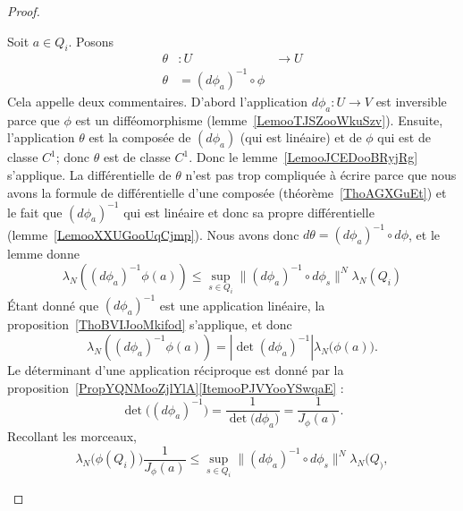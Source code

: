 \begin{proof}
\begin{enumerate}
\begin{subproof}
                Soit \( a\in Q_i\). Posons
                \begin{equation}
                    \begin{aligned}
                        \theta&\colon U&\to U \\
                        \theta&=(d\phi_{a})^{-1}\circ\phi
                    \end{aligned}
                \end{equation}
                Cela appelle deux commentaires. D'abord l'application \( d\phi_{a}\colon U\to V\) est inversible parce que \( \phi\) est un difféomorphisme (lemme~\ref{LemooTJSZooWkuSzv}). Ensuite, l'application \( \theta\) est la composée de \( (d\phi_{a})\) (qui est linéaire) et de \( \phi\) qui est de classe \( C^1\); donc \( \theta\) est de classe \( C^1\). Donc le lemme~\ref{LemooJCEDooBRyjRg} s'applique. La différentielle de \( \theta\) n'est pas trop compliquée à écrire parce que nous avons la formule de différentielle d'une composée (théorème~\ref{ThoAGXGuEt}) et le fait que \( (d\phi_{a})^{-1}\) qui est linéaire et donc sa propre différentielle (lemme~\ref{LemooXXUGooUqCjmp}). Nous avons donc \( d\theta=(d\phi_a)^{-1}\circ d\phi\), et le lemme donne
                \begin{equation}
                    \lambda_N\left( (d\phi_a)^{-1}\phi(a) \right)\leq \sup_{s\in Q_i}\|    (d\phi_a)^{-1}\circ d\phi_s  \|^N\lambda_N(Q_i)
                \end{equation}
                Étant donné que \( (d\phi_a)^{-1}\) est une application linéaire, la proposition~\ref{ThoBVIJooMkifod} s'applique, et donc
                \begin{equation}
                    \lambda_N\left( (d\phi_a)^{-1}\phi(a) \right)=| \det(d\phi_a)^{-1} |\lambda_N\big( \phi(a) \big).
                \end{equation}
                Le déterminant d'une application réciproque est donné par la proposition~\ref{PropYQNMooZjlYlA}\ref{ItemooPJVYooYSwqaE} :
                \begin{equation}
                    \det\big( (d\phi_a)^{-1} \big)=\frac{1}{ \det\big( d\phi_a \big) }=\frac{1}{ J_{\phi}(a) }.
                \end{equation}
                Recollant les morceaux,
                \begin{equation}
                    \lambda_N\big( \phi(Q_i) \big)\frac{1}{ J_{\phi}(a) }\leq \sup_{s\in Q_i}\| (d\phi_a)^{-1}\circ d\phi_s \|^N\lambda_N(Q_),
                \end{equation}

\end{subproof}
\end{enumerate}
\end{proof}
